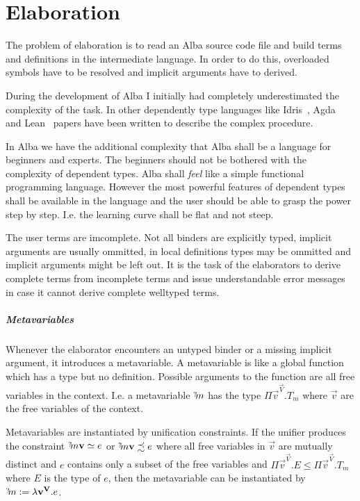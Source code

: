 \chapter{Elaboration}

The problem of elaboration is to read an Alba source code file and build terms
and definitions in the intermediate language. In order to do this, overloaded
symbols have to be resolved and implicit arguments have to derived.

During the development of Alba I initially had completely underestimated the
complexity of the task. In other dependently type languages like
Idris~\cite{brady2013}, Agda~\cite{norell2007} and Lean~\cite{demoura2015} papers
have been written to describe the complex procedure.

In Alba we have the additional complexity that Alba shall be a language for
beginners and experts. The beginners should not be bothered with the complexity
of dependent types. Alba shall \emph{feel} like a simple functional programming
language. However the most powerful features of dependent types shall be
available in the language and the user should be able to grasp the power step by
step. I.e. the learning curve shall be flat and not steep.


The user terms are imcomplete. Not all binders are explicitly typed, implicit
arguments are usually ommitted, in local definitions types may be ommitted and
implicit arguments might be left out. It is the task of the elaborators to
derive complete terms from incomplete terms and issue understandable error
messages in case it cannot derive complete welltyped terms.

\paragraph{Metavariables}
Whenever the elaborator encounters an untyped binder or a missing implicit
argument, it introduces a metavariable. A metavariable is like a global function
which has a type but no definition. Possible arguments to the function are all
free variables in the context. I.e. a metavariable $\meta{m}$ has the type $\Pi
\vec{v}^\vec{V}. T_m$ where $\vec{v}$ are the free variables of the context.

Metavariables are instantiated by unification constraints. If the unifier
produces the constraint $\meta{m} \vec{v} \unify e$ or $\meta{m} \vec{v}
\unifysub e$ where all free variables in $\vec{v}$ are mutually distinct and $e$
contains only a subset of the free variables and $\Pi \vec{v}^\vec{V}. E \le \Pi
\vec{v}^\vec{V}.T_m$ where $E$ is the type of $e$, then the metavariable can be
instantiated by $\meta{m} := \lambda \vec{v}^\vec{V}. e$.

